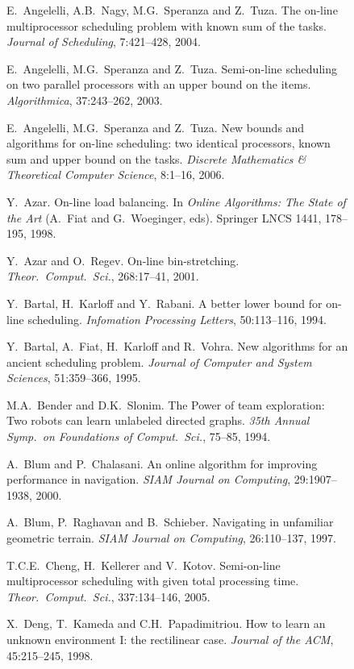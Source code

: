 \documentclass{llncs}
\begin{document}
\begin{figure}[h]
{\begin{minipage}{11.7cm}
\begin{thebibliography}{10}
E.\ Angelelli, A.B.\ Nagy, M.G.\ Speranza and Z.\ Tuza. The on-line multiprocessor scheduling
problem with known sum of the tasks. {\em Journal of Scheduling\/},  7:421--428, 2004.

E.\ Angelelli, M.G.\ Speranza and Z.\ Tuza. Semi-on-line scheduling on two parallel processors 
with an upper bound on the items. {\em Algorithmica\/}, 37:243--262, 2003.

E.\ Angelelli, M.G.\ Speranza and Z.\ Tuza. New bounds and algorithms for on-line scheduling: two 
identical processors, known sum and upper bound on the tasks. {\em Discrete Mathematics \& Theoretical 
Computer Science\/},  8:1--16, 2006.

Y.\ Azar. On-line load balancing. In {\em Online Algorithms: The State of the Art\/} (A.\ Fiat and
G.\ Woeginger, eds). Springer LNCS 1441, 178--195, 1998.

Y.\ Azar and O.\ Regev. On-line bin-stretching. {\em Theor.\ Comput.\ Sci.\/},
268:17--41, 2001.

Y.\ Bartal, H.\ Karloff and Y.\ Rabani. A better lower bound for on-line
scheduling. {\em Infomation Processing Letters}, 50:113--116, 1994.

Y.~Bartal, A.~Fiat, H.~Karloff and R.~Vohra. New algorithms for an 
ancient scheduling problem. {\em Journal of Computer and System
Sciences}, 51:359--366, 1995.

M.A.\ Bender and D.K.\ Slonim. The Power of team exploration: Two robots can learn unlabeled directed graphs. 
{\em 35th Annual Symp.\ on Foundations of Comput.\ Sci.\/}, 75--85, 1994.

A.\ Blum and P.\ Chalasani. An online algorithm for improving performance in navigation. 
{\em SIAM Journal on Computing\/}, 29:1907--1938, 2000.

A.\ Blum, P.\ Raghavan and B.\ Schieber. Navigating in unfamiliar geometric terrain. 
{\em SIAM Journal on Computing\/}, 26:110--137, 1997.

T.C.E.\ Cheng, H.\ Kellerer and V.\ Kotov. Semi-on-line multiprocessor scheduling with given 
total processing time. {\em Theor.\ Comput.\ Sci.\/}, 337:134--146, 2005.

X.\ Deng, T.\ Kameda and C.H.\ Papadimitriou. How to learn an unknown environment I: the rectilinear 
case. {\em Journal of the ACM\/}, 45:215--245, 1998.


\end{thebibliography}
\end{minipage}}
\end{figure}
\end{document}
